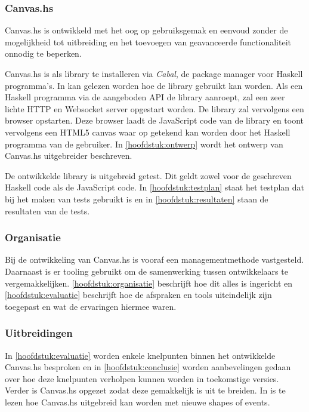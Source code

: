 \subsubsection{Canvas.hs}
Canvas.hs is ontwikkeld met het oog op gebruiksgemak en eenvoud zonder de mogelijkheid tot uitbreiding en het toevoegen van geavanceerde functionaliteit onnodig te beperken.

Canvas.hs is als library te installeren via \emph{Cabal}, de package manager voor Haskell programma's. In  kan gelezen worden hoe de library gebruikt kan worden. Als een Haskell programma via de aangeboden API de library aanroept, zal een zeer lichte HTTP en Websocket server opgestart worden. De library zal vervolgens een browser opstarten. Deze browser laadt de JavaScript code van de library en toont vervolgens een HTML5 canvas waar op getekend kan worden door het Haskell programma van de gebruiker. In \autoref{hoofdstuk:ontwerp} wordt het ontwerp van Canvas.hs uitgebreider beschreven.

De ontwikkelde library is uitgebreid getest. Dit geldt zowel voor de geschreven Haskell code als de JavaScript code. In \autoref{hoofdstuk:testplan} staat het testplan dat bij het maken van tests gebruikt is en in \autoref{hoofdstuk:resultaten} staan de resultaten van de tests.

\subsubsection{Organisatie}
Bij de ontwikkeling van Canvas.hs is vooraf een managementmethode vastgesteld. Daarnaast is er tooling gebruikt om de samenwerking tussen ontwikkelaars te vergemakkelijken. \autoref{hoofdstuk:organisatie} beschrijft hoe dit alles is ingericht en \autoref{hoofdstuk:evaluatie} beschrijft hoe de afspraken en tools uiteindelijk zijn toegepast en wat de ervaringen hiermee waren.

\subsubsection{Uitbreidingen}
In \autoref{hoofdstuk:evaluatie} worden enkele knelpunten binnen het ontwikkelde Canvas.hs besproken en in \autoref{hoofdstuk:conclusie} worden aanbevelingen gedaan over hoe deze knelpunten verholpen kunnen worden in toekomstige versies. Verder is Canvas.hs opgezet zodat deze gemakkelijk is uit te breiden. In  is te lezen hoe Canvas.hs uitgebreid kan worden met nieuwe shapes of events.


